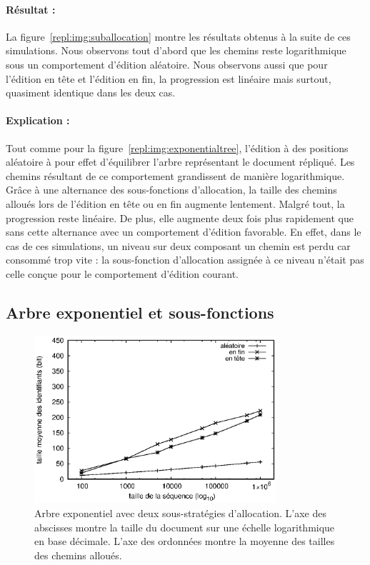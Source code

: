 \paragraph{Résultat :} La figure~\ref{repl:img:suballocation} montre les
résultats obtenus à la suite de ces simulations. Nous observons tout d'abord que
les chemins reste logarithmique sous un comportement d'édition aléatoire. Nous
observons aussi que pour l'édition en tête et l'édition en fin, la progression
est linéaire mais surtout, quasiment identique dans les deux cas.

\paragraph{Explication :} Tout comme pour la
figure~\ref{repl:img:exponentialtree}, l'édition à des positions aléatoire à
pour effet d'équilibrer l'arbre représentant le document répliqué. Les chemins
résultant de ce comportement grandissent de manière logarithmique. Grâce à une
alternance des sous-fonctions d'allocation, la taille des chemins alloués lors
de l'édition en tête ou en fin augmente lentement. Malgré tout, la progression
reste linéaire. De plus, elle augmente deux fois plus rapidement que sans cette
alternance avec un comportement d'édition favorable. En effet, dans le cas de
ces simulations, un niveau sur deux composant un chemin est perdu car consommé
trop vite : la sous-fonction d'allocation assignée à ce niveau n'était pas celle
conçue pour le comportement d'édition courant.


\subsection{Arbre exponentiel et sous-fonctions}

\begin{figure}
  \begin{center}
    \includegraphics[width=0.8\textwidth]{img/lseq/lseq.eps}
    \caption{\label{repl:img:lseq} Arbre exponentiel avec deux sous-stratégies
      d'allocation. L'axe des abscisses montre la taille du document sur une
      échelle logarithmique en base décimale. L'axe des ordonnées montre la
      moyenne des tailles des chemins alloués.}
  \end{center}
\end{figure}
